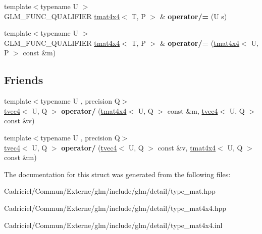 \begin{DoxyCompactItemize}
\item 
{\footnotesize template$<$typename U $>$ }\\G\+L\+M\+\_\+\+F\+U\+N\+C\+\_\+\+Q\+U\+A\+L\+I\+F\+I\+ER \hyperlink{structglm_1_1detail_1_1tmat4x4}{tmat4x4}$<$ T, P $>$ \& {\bfseries operator/=} (U s)\hypertarget{structglm_1_1detail_1_1tmat4x4_a35520d796cd223a312d44020b3031f75}{}\label{structglm_1_1detail_1_1tmat4x4_a35520d796cd223a312d44020b3031f75}

\item 
{\footnotesize template$<$typename U $>$ }\\G\+L\+M\+\_\+\+F\+U\+N\+C\+\_\+\+Q\+U\+A\+L\+I\+F\+I\+ER \hyperlink{structglm_1_1detail_1_1tmat4x4}{tmat4x4}$<$ T, P $>$ \& {\bfseries operator/=} (\hyperlink{structglm_1_1detail_1_1tmat4x4}{tmat4x4}$<$ U, P $>$ const \&m)\hypertarget{structglm_1_1detail_1_1tmat4x4_ac5a16fad4c2fb2aac28c584fbcc7ee74}{}\label{structglm_1_1detail_1_1tmat4x4_ac5a16fad4c2fb2aac28c584fbcc7ee74}

\end{DoxyCompactItemize}
\subsection*{Friends}
\begin{DoxyCompactItemize}
\item 
{\footnotesize template$<$typename U , precision Q$>$ }\\\hyperlink{structglm_1_1detail_1_1tvec4}{tvec4}$<$ U, Q $>$ {\bfseries operator/} (\hyperlink{structglm_1_1detail_1_1tmat4x4}{tmat4x4}$<$ U, Q $>$ const \&m, \hyperlink{structglm_1_1detail_1_1tvec4}{tvec4}$<$ U, Q $>$ const \&v)\hypertarget{structglm_1_1detail_1_1tmat4x4_a4d1472f6e50839c280a3a7f32396b3f1}{}\label{structglm_1_1detail_1_1tmat4x4_a4d1472f6e50839c280a3a7f32396b3f1}

\item 
{\footnotesize template$<$typename U , precision Q$>$ }\\\hyperlink{structglm_1_1detail_1_1tvec4}{tvec4}$<$ U, Q $>$ {\bfseries operator/} (\hyperlink{structglm_1_1detail_1_1tvec4}{tvec4}$<$ U, Q $>$ const \&v, \hyperlink{structglm_1_1detail_1_1tmat4x4}{tmat4x4}$<$ U, Q $>$ const \&m)\hypertarget{structglm_1_1detail_1_1tmat4x4_a786a67d54520cab5d9ecd91530012ac2}{}\label{structglm_1_1detail_1_1tmat4x4_a786a67d54520cab5d9ecd91530012ac2}

\end{DoxyCompactItemize}


The documentation for this struct was generated from the following files\+:\begin{DoxyCompactItemize}
\item 
Cadriciel/\+Commun/\+Externe/glm/include/glm/detail/type\+\_\+mat.\+hpp\item 
Cadriciel/\+Commun/\+Externe/glm/include/glm/detail/type\+\_\+mat4x4.\+hpp\item 
Cadriciel/\+Commun/\+Externe/glm/include/glm/detail/type\+\_\+mat4x4.\+inl\end{DoxyCompactItemize}
